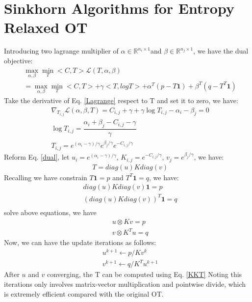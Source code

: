 \documentclass{article}
\theoremstyle{plain}
\theoremstyle{definition}
\begin{document}
\section{Sinkhorn Algorithms for Entropy Relaxed OT}
Introducing two lagrange multiplier of $\alpha \in \mathbb{R}^{n_{i} \times 1}$and $\beta \in \mathbb{R}^{n_{j} \times 1}$, we have the dual objective:
\begin{align}
&\max_{\alpha,\beta}\min_{T}<C,T> \mathcal{L}(T,\alpha, \beta) \nonumber\\
& = \max_{\alpha,\beta}\min_{T}<C,T> + \gamma<T,logT> + \alpha^{T}(p-T\mathbf{1}) + \beta^{T}(q-T^{T}\mathbf{1}) \label{Lagrange}
\end{align}
Take the derivative of Eq. \ref{Lagrange} respect to T and set it to zero, we have:
\begin{align}
&\nabla_{T_{i,j}}\mathcal{L}(\alpha,\beta,T) = C_{i,j} + \gamma + \gamma \log T_{i,j} - \alpha_{i} - \beta_{j} = 0 \nonumber\\
&\log T_{i,j} = \dfrac{\alpha_{i} + \beta_{j} - C_{i,j} - \gamma}{\gamma} \nonumber\\
& T_{i,j} = e^{(\alpha_{i}-\gamma)/\gamma} e^{\beta_{j} / \gamma} e^{-C_{i,j}/\gamma} \label{dual}
\end{align}
Reform Eq. \ref{dual}, let $u_{i} = e^{(\alpha_{i}-\gamma)/\gamma}$, $K_{i,j} = e^{-C_{i,j}/\gamma}$, $v_{j} = e^{\beta_{j} / \gamma}$, we have:
\begin{align}
&T = diag(u)K diag(v) \label{KKT}
\end{align}
Recalling we have constrain $T\mathbf{1} = p$ and $T^{T}\mathbf{1} = q$, we have: 
\begin{align}
&diag(u)K diag(v) \mathbf{1} = p \\
&(diag(u)K diag(v))^{T} \mathbf{1} = q \\
\end{align}
solve above equations, we have
\begin{align}
&u \otimes Kv = p\\
&v \otimes K^{T}u = q \label{sinkhorn}
\end{align}
Now, we can have the update iterations as follows:
\begin{align}
&u^{k+1} \leftarrow p/ Kv^{k}\\
&v^{k+1} \leftarrow q/ K^{T}u^{k+1}
\end{align}
After $u$ and $v$ converging, the T can be computed using Eq. \ref{KKT}
Noting this iterations only involves matrix-vector multiplication and pointwise divide, which is extremely efficient compared with the original OT.
\end{document}
